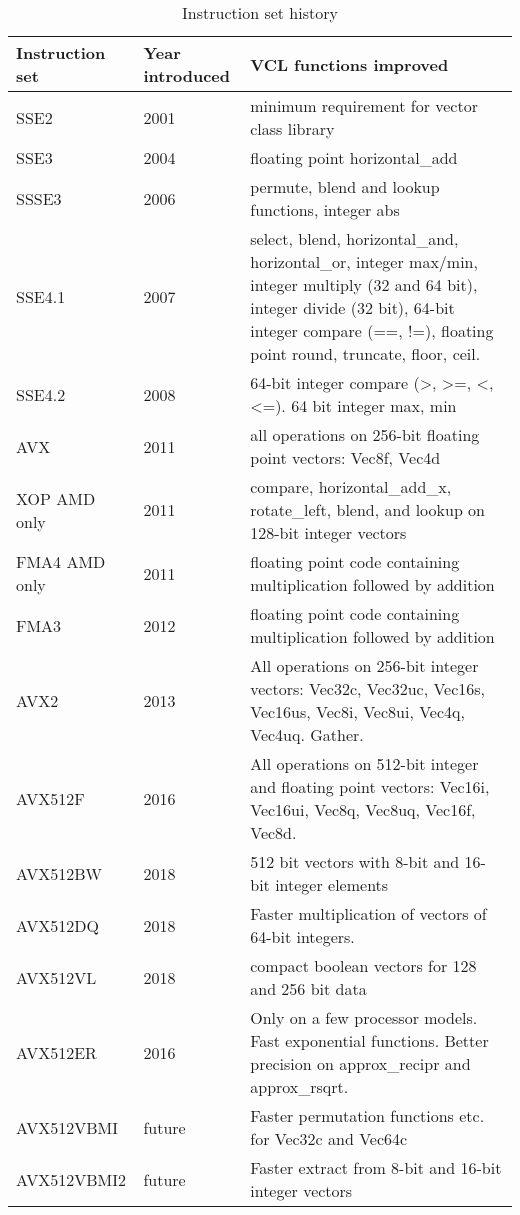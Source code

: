 \documentclass[vcl_manual.tex]{subfiles}
\begin{document}
\begin {table}[h]
\caption{Instruction set history}
\label{table:instructionSetHistory}
\begin{tabular}{|p{24mm}|p{22mm}|p{100mm}|}
\hline
\bfseries Instruction \newline set & \bfseries Year \newline introduced & \bfseries VCL functions improved \\ \hline
SSE2 & 2001 & minimum requirement for vector class library \\ \hline
SSE3 & 2004 & floating point horizontal\_add \\ \hline
SSSE3 & 2006 & permute, blend and lookup functions, integer abs \\ \hline
SSE4.1 & 2007 & select, blend, horizontal\_and, horizontal\_or, integer max/min, integer multiply (32 and 64 bit), integer divide (32 bit), 64-bit integer compare (==, !=), floating point round, truncate, floor, ceil. \\ \hline
SSE4.2 & 2008 & 64-bit integer compare (\textgreater, \textgreater =, \textless, \textless =). 64 bit integer max, min \\ \hline
AVX & 2011 & all operations on 256-bit floating point vectors: Vec8f, Vec4d \\ \hline
XOP \newline AMD only & 2011 & compare, horizontal\_add\_x, rotate\_left, blend, and lookup on 128-bit integer vectors \\ \hline
FMA4 \newline AMD only & 2011 & floating point code containing multiplication followed by addition \\ \hline
FMA3 & 2012 & floating point code containing multiplication followed by addition \\ \hline
AVX2 & 2013 & All operations on 256-bit integer vectors: Vec32c, Vec32uc, Vec16s, Vec16us, Vec8i, Vec8ui, Vec4q, Vec4uq. Gather. \\ \hline
AVX512F & 2016 & All operations on 512-bit integer and floating point vectors: Vec16i, Vec16ui, Vec8q, Vec8uq, Vec16f, Vec8d. \\ \hline
AVX512BW & 2018 & 512 bit vectors with 8-bit and 16-bit integer elements \\ \hline
AVX512DQ & 2018 & Faster multiplication of vectors of 64-bit integers. \\ \hline
AVX512VL & 2018 & compact boolean vectors for 128 and 256 bit data \\ \hline
AVX512ER & 2016 & Only on a few processor models. Fast exponential functions. Better precision on approx\_recipr and approx\_rsqrt. \\ \hline
AVX512VBMI & future & Faster permutation functions etc. for Vec32c and Vec64c \\ \hline
AVX512VBMI2 & future & Faster extract from 8-bit and 16-bit integer vectors \\ \hline
\end{tabular}
\end{table}
\end{document}
